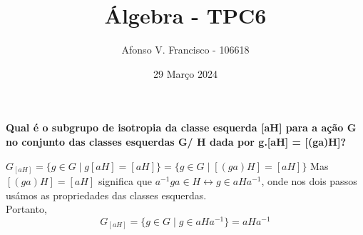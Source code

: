 \documentclass{article}
\title{Álgebra - TPC6}
\author{Afonso V. Francisco - 106618 }
\date{29 Março 2024}
\begin{document}
\maketitle
\textbf{Qual é o subgrupo de isotropia da classe esquerda  [aH] para a ação G no conjunto das classes esquerdas G/ H dada por  g.[aH] = [(ga)H]?}

$G_{[aH]}=\{g \in G \mid g[aH]=[aH]\}=\{g \in G \mid [(ga)H]=[aH]\}$
Mas $[(ga)H]=[aH]$ significa que $a^{-1}ga \in H \leftrightarrow g \in aHa^{-1}$, onde nos dois passos usámos as propriedades das classes esquerdas.
\\Portanto, $$G_{[aH]}=\{g \in G \mid g \in aHa^{-1}\}=aHa^{-1}$$
\end{document}
